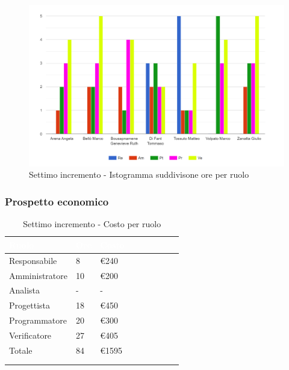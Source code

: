 {{      \begin{figure}[H]
        \includegraphics[width=15cm]{sezioni/images/settimo.png}
        \centering
        \caption{Settimo incremento - Istogramma suddivisone ore per ruolo}
     \end{figure}
    }

    \subsubsection{Prospetto economico}
    {
        \setlength{\freewidth}{\dimexpr\textwidth-30\tabcolsep}
        \renewcommand{\arraystretch}{1.0}
        \setlength{\aboverulesep}{0pt}
        \setlength{\belowrulesep}{0pt}
        \begin{longtable}{C{.4\freewidth} C{.2\freewidth} C{.2\freewidth} C{.2\freewidth} C{.2\freewidth} C{.2\freewidth} C{.2\freewidth} C{.2\freewidth} C{.2\freewidth}}
          \toprule
        \textcolor{white}{\textbf{Ruolo}}&
        \textcolor{white}{\textbf{Ore}}&
        \textcolor{white}{\textbf{Costo}}\\
        \toprule
        \endhead
            
        Responsabile  & 8 & \euro240\\
        Amministratore  & 10 & \euro200 \\
        Analista &- & -\\
        Progettista &18 &\euro450\\
        Programmatore &20 & \euro300\\
        Verificatore &27 &\euro405\\
        Totale&84&\euro1595\\
        \bottomrule
      \\
        \caption{Settimo incremento - Costo per ruolo} 


\end{longtable}}}
